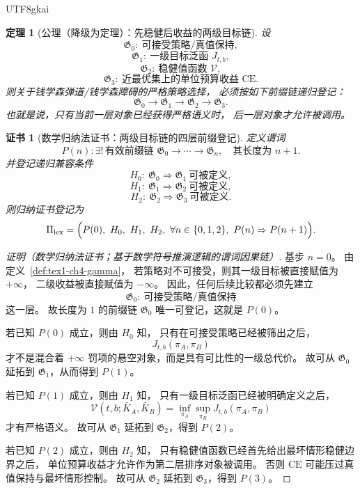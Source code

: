 \documentclass[12pt]{article}
\newtheorem{theorem}{定理}[section]
\newtheorem{Certificate}{证书}[section]
\begin{document}
\begin{CJK*}{UTF8}{gkai}
\begin{theorem}[公理（降级为定理）：先稳健后收益的两级目标链]
\label{thm:tex1-ch4-priority}
设
\[
  \mathfrak G_0:\ \text{可接受策略/真值保持},
\]
\[
  \mathfrak G_1:\ \text{一级目标泛函 }J_{t,b},
\]
\[
  \mathfrak G_2:\ \text{稳健值函数 }\mathcal V,
\]
\[
  \mathfrak G_3:\ \text{近最优集上的单位预算收益 } \mathrm{CE}.
\]
则关于钱学森弹道/钱学森障碍的严格策略选择，
必须按如下前缀链递归登记：
\[
  \mathfrak G_0
  \to
  \mathfrak G_1
  \to
  \mathfrak G_2
  \to
  \mathfrak G_3.
\]
也就是说，只有当前一层对象已经获得严格语义时，
后一层对象才允许被调用。
\end{theorem}

\begin{Certificate}[数学归纳法证书：两级目标链的四层前缀登记]
\label{cert:tex1-ch4-priority}
定义谓词
\[
  P(n):
  \exists!\,\text{有效前缀链 }\mathfrak G_0\to\cdots\to \mathfrak G_n,
  \quad
  \text{其长度为 }n+1.
\]
并登记递归兼容条件
\[
  H_0:\ \mathfrak G_0\Rightarrow \mathfrak G_1\ \text{可被定义},
\]
\[
  H_1:\ \mathfrak G_1\Rightarrow \mathfrak G_2\ \text{可被定义},
\]
\[
  H_2:\ \mathfrak G_2\Rightarrow \mathfrak G_3\ \text{可被定义}.
\]
则归纳证书登记为
\[
  \Pi_{\mathrm{lex}}
  =
  \Bigl(
    P(0),\
    H_0,\
    H_1,\
    H_2,\
    \forall n\in\{0,1,2\},\ P(n)\Rightarrow P(n+1)
  \Bigr).
\]
\end{Certificate}

\begin{proof}[证明（数学归纳法证书；基于数学符号推演逻辑的谓词因果链）]
基步 $n=0$。
由定义~\ref{def:tex1-ch4-gamma}，
若策略对不可接受，则其一级目标被直接赋值为 $+\infty$，
二级收益被直接赋值为 $-\infty$。
因此，任何后续比较都必须先建立
\[
  \mathfrak G_0:\ \text{可接受策略/真值保持}
\]
这一层。
故长度为 $1$ 的前缀链 $\mathfrak G_0$ 唯一可登记，这就是 \(P(0)\)。

若已知 \(P(0)\) 成立，则由 \(H_0\) 知，
只有在可接受策略已经被筛出之后，
\[
  J_{t,b}(\pi_A,\pi_B)
\]
才不是混合着 $+\infty$ 罚项的悬空对象，而是具有可比性的一级总代价。
故可从 \(\mathfrak G_0\) 延拓到 \(\mathfrak G_1\)，从而得到 \(P(1)\)。

若已知 \(P(1)\) 成立，则由 \(H_1\) 知，
只有一级目标泛函已经被明确定义之后，
\[
  \mathcal V(t,b;\bar K_A,\bar K_B)
  =
  \inf_{\pi_A}\sup_{\pi_B}J_{t,b}(\pi_A,\pi_B)
\]
才有严格语义。
故可从 \(\mathfrak G_1\) 延拓到 \(\mathfrak G_2\)，得到 \(P(2)\)。

若已知 \(P(2)\) 成立，则由 \(H_2\) 知，
只有稳健值函数已经首先给出最坏情形稳健边界之后，
单位预算收益才允许作为第二层排序对象被调用。
否则 \(\mathrm{CE}\) 可能压过真值保持与最坏情形控制。
故可从 \(\mathfrak G_2\) 延拓到 \(\mathfrak G_3\)，得到 \(P(3)\)。


\end{proof}
\end{CJK*}
\end{document}
